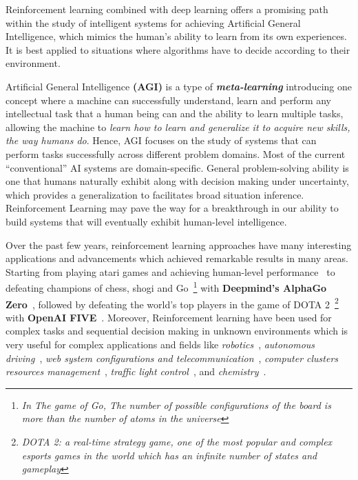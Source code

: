 Reinforcement learning combined with deep learning offers a promising path within the study of intelligent systems for achieving Artificial General Intelligence, which mimics the human's ability to learn from its own experiences. It is best applied to situations where algorithms have to decide according to their environment.

Artificial General Intelligence \textbf{(AGI)} is a type of \textit{\textbf{meta-learning}} introducing one concept where a machine can successfully understand, learn and perform any intellectual task that a human being can and the ability to learn multiple tasks, allowing the machine to \textit{learn how to learn and generalize it to acquire new skills, the way humans do}. Hence, AGI focuses on the study of systems that can perform tasks successfully across different problem domains. Most of the current ``conventional'' AI systems are domain-specific. General problem-solving ability is one that humans naturally exhibit along with decision making under uncertainty, which provides a generalization to facilitates broad situation inference.
Reinforcement Learning may pave the way for a breakthrough in our ability to build systems that will eventually exhibit human-level intelligence.

Over the past few years, reinforcement learning approaches have many interesting applications and advancements which achieved remarkable results in many areas. Starting from playing atari games and achieving human-level performance~\parencite{mnih2015human} to defeating champions of chess, shogi and Go~\footnote{\textit{In The game of Go, The number of possible configurations of the board is more than the number of atoms in the universe}} with \textbf{Deepmind's AlphaGo Zero}~\parencite{silver2017mastering}, followed by defeating the world's top players in the game of DOTA 2~\footnote{\textit{DOTA 2: a real-time strategy game, one of the most popular and complex esports games in the world which has an infinite number of states and gameplay}} with \textbf{OpenAI FIVE}~\parencite{OpenAI_dota}. Moreover, Reinforcement learning have been used for complex tasks and sequential decision making in unknown environments which is very useful for complex applications and fields like \textit{robotics}~\parencite{kober2013reinforcement, levine2016end, 45926, singh2019end}, \textit{autonomous driving}~\parencite{sallab2017deep, xu2018zero}, \textit{web system configurations and telecommunication}~\parencite{bu2009reinforcement}, \textit{computer clusters resources management}~\parencite{mao2016resource}, \textit{traffic light control}~\parencite{arel2010reinforcement}, and \textit{chemistry}~\parencite{zhou2017optimizing}.

